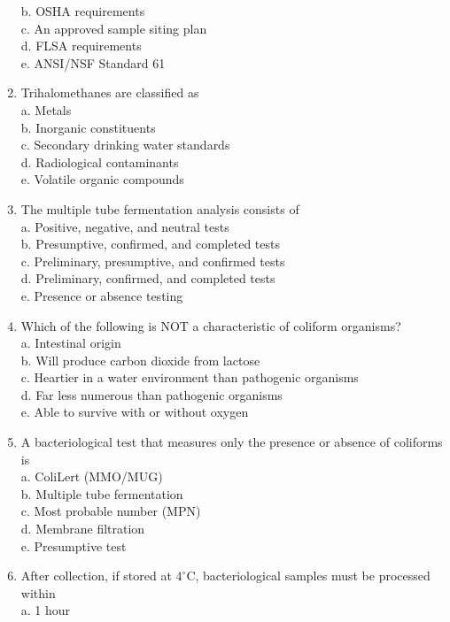 \documentclass{article}
\begin{document}
\begin{enumerate}[1.]
b. OSHA requirements\\
c. An approved sample siting plan\\
d. FLSA requirements\\
e. ANSI/NSF Standard 61\\
  \item Trihalomethanes are classified as\\
a. Metals\\
b. Inorganic constituents\\
c. Secondary drinking water standards\\
d. Radiological contaminants\\
e. Volatile organic compounds\\
 \item The multiple tube fermentation analysis consists of\\
a. Positive, negative, and neutral tests\\
b. Presumptive, confirmed, and completed tests\\
c. Preliminary, presumptive, and confirmed tests\\
d. Preliminary, confirmed, and completed tests\\
e. Presence or absence testing\\
  \item Which of the following is NOT a characteristic of coliform organisms?\\
a. Intestinal origin\\
b. Will produce carbon dioxide from lactose\\
c. Heartier in a water environment than pathogenic organisms\\
d. Far less numerous than pathogenic organisms\\
e. Able to survive with or without oxygen\\
  \item A bacteriological test that measures only the presence or absence of coliforms is\\
a. ColiLert (MMO/MUG)\\
b. Multiple tube fermentation\\
c. Most probable number (MPN)\\
d. Membrane filtration\\
e. Presumptive test\\
  \item After collection, if stored at $4^{\circ} \mathrm{C}$, bacteriological samples must be processed within\\
a. 1 hour\\

\end{enumerate}
\end{document}
